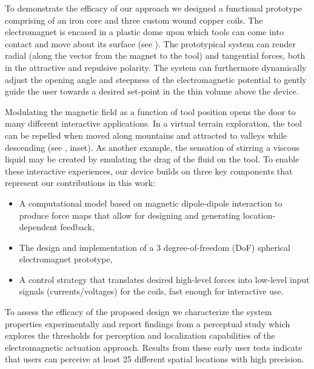 To demonstrate the efficacy of our approach we designed a functional prototype comprising of an iron core and three custom wound copper coils. The electromagnet is encased in a plastic dome upon which tools can come into contact and move about its surface (see ). The prototypical system can render radial (along the vector from the magnet to the tool) and tangential forces, both in the attractive and repulsive polarity. The system can furthermore dynamically adjust the opening angle and steepness of the electromagnetic potential to
 gently guide the user towards a desired set-point in the thin volume above the device.    

Modulating the magnetic field as a function of tool position opens the door to many different interactive applications. In a virtual terrain exploration, the tool can be repelled when moved along mountains and attracted to valleys while descending (see , inset). As another example, the sensation of stirring a viscous liquid may be created by emulating the drag of the fluid on the tool. To enable these interactive experiences, our device builds on three key components that represent our contributions in this work:
\begin{itemize}
    \item A computational model based on magnetic dipole-dipole interaction to produce force maps that allow for designing and generating location-dependent feedback, 
    \item The design and implementation of a 3 degree-of-freedom (DoF) spherical electromagnet prototype,
    \item A control strategy that translates desired high-level forces into low-level input signals (currents/voltages) for the coils, fast enough for interactive use.
\end{itemize}

To assess the efficacy of the proposed design we characterize the system properties experimentally and report findings from a perceptual study which explores the thresholds for perception and localization capabilities of the electromagnetic actuation approach. Results from these early user tests indicate that users can perceive at least 25 different spatial locations with high precision.  




